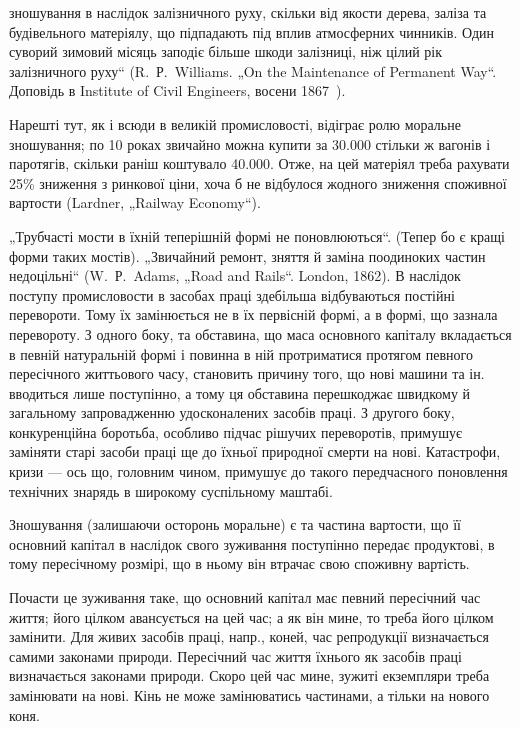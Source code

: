 \parcont{}  %
зношування в наслідок залізничного руху, скільки від якости дерева, заліза та будівельного
матеріялу, що підпадають під вплив атмосферних чинників. Один суворий зимовий місяць заподіє більше
шкоди залізниці, ніж цілий рік залізничного руху“ (R.~Р.~Williams. „On the Maintenance of Permanent
Way“. Доповідь в Institute of Civil Engineers, восени 1867~).

Нарешті тут, як і всюди в великій промисловості, відіграє ролю моральне зношування; по 10 роках
звичайно можна купити за \num{30.000} стільки ж вагонів і паротягів, скільки раніш коштувало \num{40.000}. Отже, на цей матеріял треба рахувати 25\% зниження з ринкової ціни, хоча б не відбулося
жодного зниження споживної вартости (Lardner,
„Railway Economy“).

„Трубчасті мости в їхній теперішній формі не поновлюються“. (Тепер бо є кращі форми таких мостів).
„Звичайний ремонт, зняття й заміна поодиноких частин недоцільні“ (W.~Р.~Adams, „Road and Rails“.
London, 1862). В наслідок поступу промисловости в засобах праці здебільша відбуваються постійні
перевороти. Тому їх замінюється не в їх первісній формі, а в формі, що зазнала перевороту. З одного
боку, та обставина,
що маса основного капіталу вкладається в певній натуральній формі і повинна в ній протриматися
протягом певного пересічного життьового часу, становить причину того, що нові машини та ін.
вводиться лише поступінно, а тому ця обставина перешкоджає швидкому й загальному запровадженню
удосконалених засобів праці. З другого боку, конкуренційна боротьба, особливо підчас рішучих
переворотів, примушує заміняти
старі засоби праці ще до їхньої природної смерти на нові. Катастрофи, кризи — ось що, головним
чином, примушує до такого передчасного поновлення технічних знарядь в широкому суспільному маштабі.

Зношування (залишаючи осторонь моральне) є та частина вартости, що її основний капітал в наслідок
свого зуживання поступінно передає продуктові, в тому пересічному розмірі, що в ньому він втрачає
свою споживну вартість.

Почасти це зуживання таке, що основний капітал має певний пересічний час життя; його цілком
авансується на цей час; а як він мине, то треба його цілком замінити. Для живих засобів праці,
напр., коней, час репродукції визначається самими законами природи. Пересічний час життя їхнього як
засобів праці визначається законами природи. Скоро цей час мине, зужиті екземпляри треба замінювати
на нові. Кінь не може замінюватись частинами, а тільки на нового коня.

